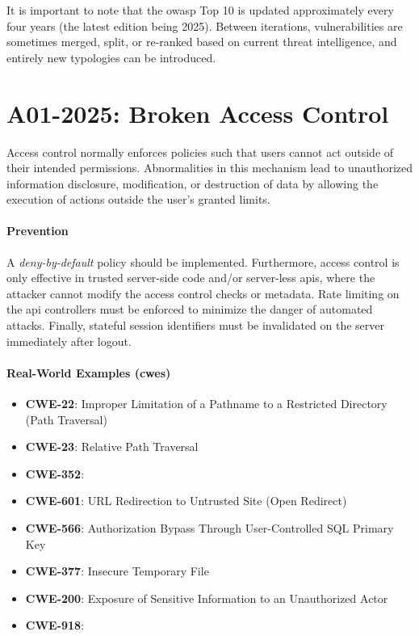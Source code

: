 It is important to note that the \gls{owasp} Top 10 is updated approximately every four years (the latest edition being 2025). Between iterations, vulnerabilities are sometimes merged, split, or re-ranked based on current threat intelligence, and entirely new typologies can be introduced.

\section{A01-2025: Broken Access Control}
Access control normally enforces policies such that users cannot act outside of their intended permissions. Abnormalities in this mechanism lead to unauthorized information disclosure, modification, or destruction of data by allowing the execution of actions outside the user's granted limits.

\paragraph{Prevention} A \textit{deny-by-default} policy should be implemented. Furthermore, access control is only effective in trusted server-side code and/or server-less \glspl{api}, where the attacker cannot modify the access control checks or metadata. Rate limiting on the \gls{api} controllers must be enforced to minimize the danger of automated attacks. Finally, stateful session identifiers must be invalidated on the server immediately after logout.

\paragraph{Real-World Examples (\glspl{cwe})}
\begin{itemize}
    \item \textbf{CWE-22}: Improper Limitation of a Pathname to a Restricted Directory (Path Traversal)
    \item \textbf{CWE-23}: Relative Path Traversal
    \item \textbf{CWE-352}: 
    \item \textbf{CWE-601}: URL Redirection to Untrusted Site (Open Redirect)
    \item \textbf{CWE-566}: Authorization Bypass Through User-Controlled SQL Primary Key
    \item \textbf{CWE-377}: Insecure Temporary File
    \item \textbf{CWE-200}: Exposure of Sensitive Information to an Unauthorized Actor
    \item \textbf{CWE-918}: 
\end{itemize}

